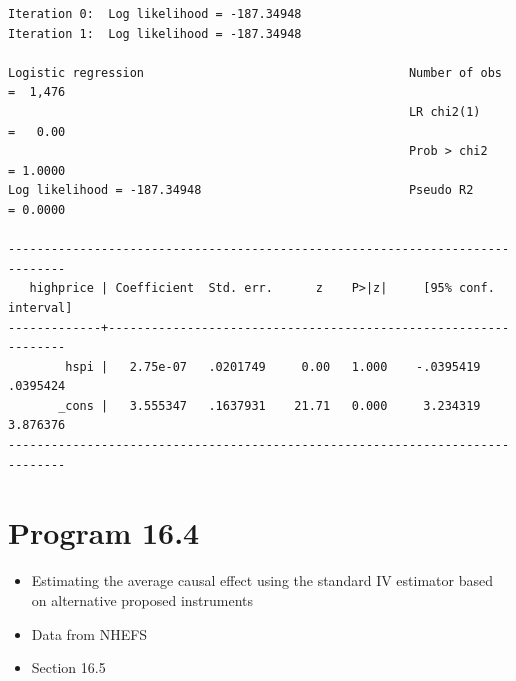 \documentclass[
  10pt,
  a4paper,
]{book}
\providecommand{\tightlist}{%
  \setlength{\itemsep}{0pt}\setlength{\parskip}{0pt}}
\begin{document}
\begin{verbatim}
Iteration 0:  Log likelihood = -187.34948  
Iteration 1:  Log likelihood = -187.34948  

Logistic regression                                     Number of obs =  1,476
                                                        LR chi2(1)    =   0.00
                                                        Prob > chi2   = 1.0000
Log likelihood = -187.34948                             Pseudo R2     = 0.0000

------------------------------------------------------------------------------
   highprice | Coefficient  Std. err.      z    P>|z|     [95% conf. interval]
-------------+----------------------------------------------------------------
        hspi |   2.75e-07   .0201749     0.00   1.000    -.0395419    .0395424
       _cons |   3.555347   .1637931    21.71   0.000     3.234319    3.876376
------------------------------------------------------------------------------
\end{verbatim}

\section{Program 16.4}\label{program-16.4-1}

\begin{itemize}
\tightlist
\item
  Estimating the average causal effect using the standard IV estimator based on alternative proposed instruments
\item
  Data from NHEFS
\item
  Section 16.5
\end{itemize}
\end{document}
